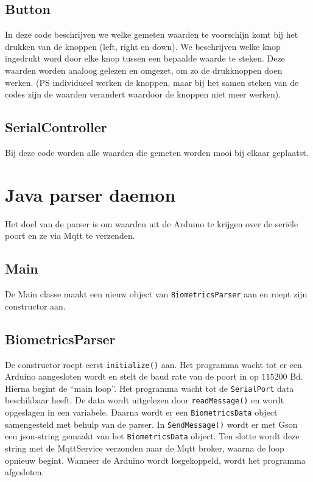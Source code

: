 \documentclass[a4paper]{report}
\newcommand{\code}[1]{\colorbox{light-gray}{\texttt{#1}}}
\begin{document}
            \subsection{Button}
                In deze code beschrijven we welke gemeten waarden te voorschijn komt bij het drukken van de knoppen (left, right en down).
                We beschrijven welke knop ingedrukt word door elke knop tussen een bepaalde waarde te steken.
                Deze waarden worden analoog gelezen en omgezet, om zo de drukknoppen doen werken.
                (PS individueel werken de knoppen, maar bij het samen steken van de codes zijn de waarden verandert waardoor de knoppen niet meer werken).
                
            \subsection{SerialController}
                Bij deze code worden alle waarden die gemeten worden mooi bij elkaar geplaatst.
                
    \section{Java parser daemon}
        Het doel van de parser is om waarden uit de Arduino te krijgen over de seri\"ele poort en ze via Mqtt te verzenden.

        \subsection{Main}
            De Main classe maakt een nieuw object van \code{BiometricsParser} aan en roept zijn constructor aan.

        \subsection{BiometricsParser}
            De constructor roept eerst \code{initialize()} aan.
            Het programma wacht tot er een Arduino aangesloten wordt en stelt de baud rate van de poort in op $115200$ Bd.
            Hierna begint de ``main loop''. Het programma wacht tot de \code{SerialPort} data beschikbaar heeft.
            De data wordt uitgelezen door \code{readMessage()} en wordt opgeslagen in een variabele.
            Daarna wordt er een \code{BiometricsData} object samengesteld met behulp van de parser.
            In \code{SendMessage()} wordt er met Gson een json-string gemaakt van het \code{BiometricsData} object.
            Ten slotte wordt deze string met de MqttService verzonden naar de Mqtt broker, waarna de loop opnieuw begint.
            Wanneer de Arduino wordt losgekoppeld, wordt het programma afgesloten.
\end{document}
